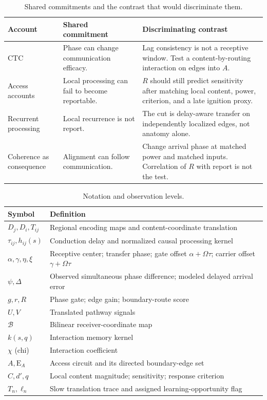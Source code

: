 \documentclass[submission,nolinenumbers]{esj}
\newcommand{\Om}{\Omega}
\newcommand{\Bmap}{\mathcal{B}}
\newcommand{\Content}{C}
\begin{document}
\begin{table}[htbp]\centering\caption{Shared commitments and the contrast that would discriminate them.}\label{tab:accounts}
\begin{tabular}{@{}p{.22\linewidth}p{.30\linewidth}p{.40\linewidth}@{}}\toprule
Account & Shared commitment & Discriminating contrast\\\midrule
CTC \citep{fries2015} & Phase can change communication efficacy. & Lag consistency is not a receptive window. Test a content-by-routing interaction on edges into $A$.\\
Access accounts \citep{dehaene2006} & Local processing can fail to become reportable. & $R$ should still predict sensitivity after matching local content, power, criterion, and a late ignition proxy.\\
Recurrent processing \citep{lamme2006} & Local recurrence is not report. & The cut is delay-aware transfer on independently localized edges, not anatomy alone.\\
Coherence as consequence \citep{schneider2021} & Alignment can follow communication. & Change arrival phase at matched power and matched inputs. Correlation of $R$ with report is not the test.\\\bottomrule
\end{tabular}\end{table}

\begin{table}[htbp]\centering\caption{Notation and observation levels.}\label{tab:notation}
\begin{tabular}{@{}p{.23\linewidth}p{.71\linewidth}@{}}\toprule
Symbol & Definition\\\midrule
$D_j,D_i,T_{ij}$ & Regional encoding maps and content-coordinate translation\\
$\tau_{ij},h_{ij}(s)$ & Conduction delay and normalized causal processing kernel\\
$\alpha,\gamma,\eta,\xi$ & Receptive center; transfer phase; gate offset $\alpha+\Om\tau$; carrier offset $\gamma+\Om\tau$\\
$\psi,\Delta$ & Observed simultaneous phase difference; modeled delayed arrival error\\
$g,r,R$ & Phase gate; edge gain; boundary-route score\\
$U,V$ & Translated pathway signals\\
$\Bmap$ & Bilinear receiver-coordinate map\\
$k(s,q)$ & Interaction memory kernel\\
$\chi$ (chi) & Interaction coefficient\\
$A,\mathrm{E}_A$ & Access circuit and its directed boundary-edge set\\
$\Content,d',q$ & Local content magnitude; sensitivity; response criterion\\
$T_n,\ell_n$ & Slow translation trace and assigned learning-opportunity flag\\\bottomrule
\end{tabular}\end{table}
\end{document}
